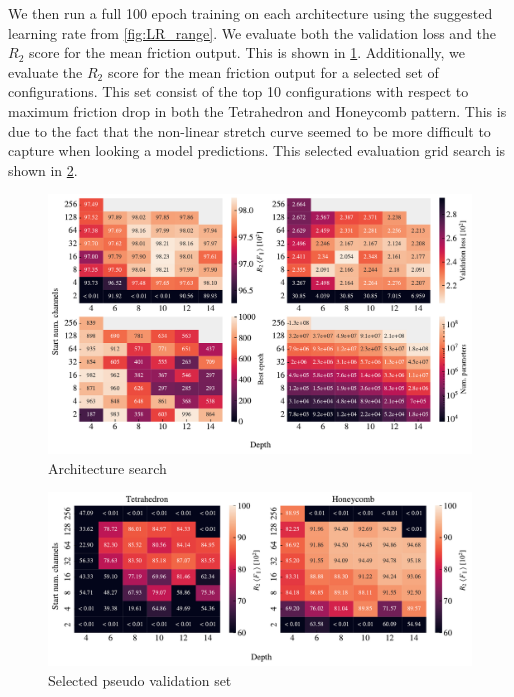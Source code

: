 We then run a full 100 epoch training on each architecture using the suggested learning rate from \cref{fig:LR_range}. We evaluate both the validation loss and the $R_2$ score for the mean friction output. This is shown in \cref{fig:A_search_perf}. Additionally, we evaluate the $R_2$ score for the mean friction output for a selected set of configurations. This set consist of the top 10 configurations with respect to maximum friction drop in both the Tetrahedron and Honeycomb pattern. This is due to the fact that the non-linear stretch curve seemed to be more difficult to capture when looking a model predictions. This selected evaluation grid search is shown in \cref{fig:A_search_compare}.

\begin{figure}[H]
  \centering
  \includegraphics[width=\linewidth]{figures/ML/A_search_perf.pdf}
  \caption{Architecture search}
  \label{fig:A_search_perf}
\end{figure}  




\begin{figure}[H]
  \centering
  \includegraphics[width=\linewidth]{figures/ML/A_search_compare_perf}
  \caption{Selected pseudo validation set}
  \label{fig:A_search_compare}
\end{figure}  

